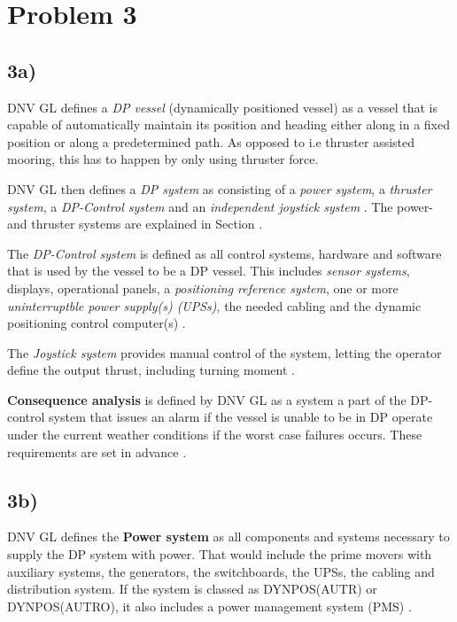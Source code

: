 \section*{Problem 3}
\subsection*{3a)}
 \label{par:Def_DP_system}

DNV GL defines a \textit{DP vessel} (dynamically positioned vessel) as a vessel that is capable of automatically maintain its position and heading either along in a fixed position or along a predetermined path. As opposed to i.e thruster assisted mooring, this has to happen by only using thruster force\cite{RulesShipsDNVGLPart6Chap3}. 

DNV GL then defines a \textit{DP system} as consisting of a \textit{power system}, a \textit{thruster system}, a \textit{DP-Control system} and an \textit{independent joystick system} \cite{RulesShipsDNVGLPart6Chap3}. The power- and thruster systems are explained in Section . 

The \textit{DP-Control system} is defined as all control systems, hardware and software that is used by the vessel to be a DP vessel. This includes \textit{sensor systems}, displays, operational panels, a \textit{positioning reference system}, one or more \textit{uninterruptble power supply(s) (UPSs)}, the needed cabling and the dynamic positioning control computer(s) \cite{RulesShipsDNVGLPart6Chap3}.  

The \textit{Joystick system} provides manual control of the system, letting the operator define the output thrust, including turning moment \cite{RulesShipsDNVGLPart6Chap3}.  

\textbf{Consequence analysis} is defined by DNV GL as a system a part of the DP-control system that issues an alarm if the vessel is unable to be in DP operate under the current weather conditions if the worst case failures occurs. These requirements are set in advance \cite{RulesShipsDNVGLPart6Chap3}. 


\subsection*{3b)} \label{sec:3b}
DNV GL defines the \textbf{Power system} as all components and systems necessary to supply the DP system with power. That would include the prime movers with auxiliary systems, the generators, the switchboards, the UPSs, the cabling and distribution system. If the system is classed as DYNPOS(AUTR) or DYNPOS(AUTRO), it also includes a power management system (PMS) \cite{RulesShipsDNVGLPart6Chap3}.  


